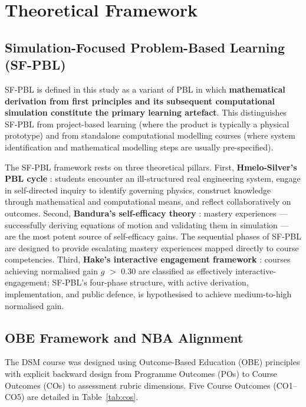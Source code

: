 \documentclass[12pt, a4paper]{article}
\begin{document}
\section{Theoretical Framework}

\subsection{Simulation-Focused Problem-Based Learning (SF-PBL)}

SF-PBL is defined in this study as a variant of PBL in which
\textbf{mathematical derivation from first principles and its
subsequent computational simulation constitute the primary learning
artefact}. This distinguishes SF-PBL from project-based learning
(where the product is typically a physical prototype) and from
standalone computational modelling courses (where system
identification and mathematical modelling steps are usually
pre-specified).

The SF-PBL framework rests on three theoretical pillars. First,
\textbf{Hmelo-Silver's PBL cycle} \citeyearpar{hmelo2004problem}:
students encounter an ill-structured real engineering system,
engage in self-directed inquiry to identify governing physics,
construct knowledge through mathematical and computational means,
and reflect collaboratively on outcomes. Second,
\textbf{Bandura's self-efficacy theory}
\citeyearpar{bandura1997self}: mastery experiences --- successfully
deriving equations of motion and validating them in simulation ---
are the most potent source of self-efficacy gains. The sequential
phases of SF-PBL are designed to provide escalating mastery
experiences mapped directly to course competencies. Third,
\textbf{Hake's interactive engagement framework}
\citeyearpar{hake1998interactive}: courses achieving normalised
gain $g$ $>$ 0.30 are classified as effectively
interactive-engagement; SF-PBL's four-phase structure, with active
derivation, implementation, and public defence, is hypothesised to
achieve medium-to-high normalised gain.

\subsection{OBE Framework and NBA Alignment}

The DSM course was designed using Outcome-Based Education (OBE)
principles \citep{spady1994outcome} with explicit backward design
from Programme Outcomes (POs) to Course Outcomes (COs) to
assessment rubric dimensions. Five Course Outcomes (CO1--CO5) are
detailed in Table~\ref{tab:cos}.
\end{document}
